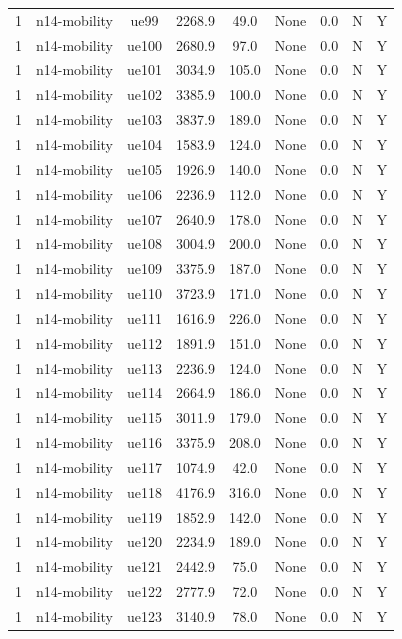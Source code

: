 \begin{table}[ht]
\begin{tabular}{|c|c|c|c|c|c|c|c|c|}
1 & n14-mobility & ue99 & 2268.9 & 49.0 & None & 0.0 & N & Y \\
1 & n14-mobility & ue100 & 2680.9 & 97.0 & None & 0.0 & N & Y \\
1 & n14-mobility & ue101 & 3034.9 & 105.0 & None & 0.0 & N & Y \\
1 & n14-mobility & ue102 & 3385.9 & 100.0 & None & 0.0 & N & Y \\
1 & n14-mobility & ue103 & 3837.9 & 189.0 & None & 0.0 & N & Y \\
1 & n14-mobility & ue104 & 1583.9 & 124.0 & None & 0.0 & N & Y \\
1 & n14-mobility & ue105 & 1926.9 & 140.0 & None & 0.0 & N & Y \\
1 & n14-mobility & ue106 & 2236.9 & 112.0 & None & 0.0 & N & Y \\
1 & n14-mobility & ue107 & 2640.9 & 178.0 & None & 0.0 & N & Y \\
1 & n14-mobility & ue108 & 3004.9 & 200.0 & None & 0.0 & N & Y \\
1 & n14-mobility & ue109 & 3375.9 & 187.0 & None & 0.0 & N & Y \\
1 & n14-mobility & ue110 & 3723.9 & 171.0 & None & 0.0 & N & Y \\
1 & n14-mobility & ue111 & 1616.9 & 226.0 & None & 0.0 & N & Y \\
1 & n14-mobility & ue112 & 1891.9 & 151.0 & None & 0.0 & N & Y \\
1 & n14-mobility & ue113 & 2236.9 & 124.0 & None & 0.0 & N & Y \\
1 & n14-mobility & ue114 & 2664.9 & 186.0 & None & 0.0 & N & Y \\
1 & n14-mobility & ue115 & 3011.9 & 179.0 & None & 0.0 & N & Y \\
1 & n14-mobility & ue116 & 3375.9 & 208.0 & None & 0.0 & N & Y \\
1 & n14-mobility & ue117 & 1074.9 & 42.0 & None & 0.0 & N & Y \\
1 & n14-mobility & ue118 & 4176.9 & 316.0 & None & 0.0 & N & Y \\
1 & n14-mobility & ue119 & 1852.9 & 142.0 & None & 0.0 & N & Y \\
1 & n14-mobility & ue120 & 2234.9 & 189.0 & None & 0.0 & N & Y \\
1 & n14-mobility & ue121 & 2442.9 & 75.0 & None & 0.0 & N & Y \\
1 & n14-mobility & ue122 & 2777.9 & 72.0 & None & 0.0 & N & Y \\
1 & n14-mobility & ue123 & 3140.9 & 78.0 & None & 0.0 & N & Y \\

\end{tabular}
\end{table}
